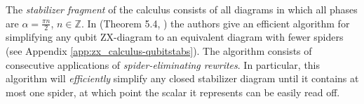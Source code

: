 The \emph{stabilizer fragment} of the calculus consists of all diagrams in which all phases are $\alpha=\frac{\pi n}{2}$, $n\in\mathbb{Z}$.
In (Theorem 5.4, \cite{graph_theoretic_simplification}) the authors give an efficient algorithm for simplifying any qubit ZX-diagram to an equivalent diagram with fewer spiders (see Appendix \ref{app:zx_calculus-qubitstabs}).
The algorithm consists of consecutive applications of
\emph{spider-eliminating rewrites}.
In particular,
this algorithm will \emph{efficiently} simplify any closed stabilizer diagram until it contains at most one spider, at which point the scalar it represents can be easily read off. 
